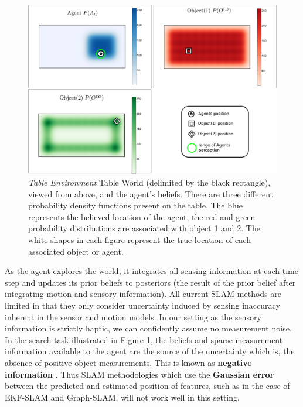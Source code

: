 \begin{figure}
  \centering
  \includegraphics[width=0.95\linewidth]{./ch5-MLMF/Figures/Figure1.pdf}
  \caption{ \textit{Table Environment} Table World (delimited by the black rectangle), viewed from above, and the agent's beliefs. 
  There are three different probability density functions present on the table. 
  The blue represents the believed location of the agent, the red and green probability distributions are associated with object 1 and 2.
  The white shapes in each figure represent the true location of each associated object or agent.}
  \label{fig:Figure1}
\end{figure}
\vspace*{0.6cm}

As the agent explores the world, it integrates all sensing information at each time step and updates its prior beliefs to posteriors
(the result of the prior belief after integrating motion and sensory information).
All current SLAM methods are limited in that they only consider uncertainty induced by sensing inaccuracy inherent in 
the sensor and motion models. In our setting as the sensory information is strictly haptic, we can confidently assume no measurement noise. 
In the search task illustrated in Figure \ref{fig:Figure1}, the beliefs and sparse measurement information available to the agent are 
the source of the uncertainty which is, the absence of positive object measurements. 
This is known as \textbf{negative information} \cite[p.313]{Thrun_Burgard_Fox_2005} \cite{Thrun02particlefilters,negative_info_markov_localisation}. 
Thus SLAM methodologies which use the \textbf{Gaussian error} between the predicted and estimated position of features, such as in the case 
of EKF-SLAM and Graph-SLAM, will not work well in this setting. 

